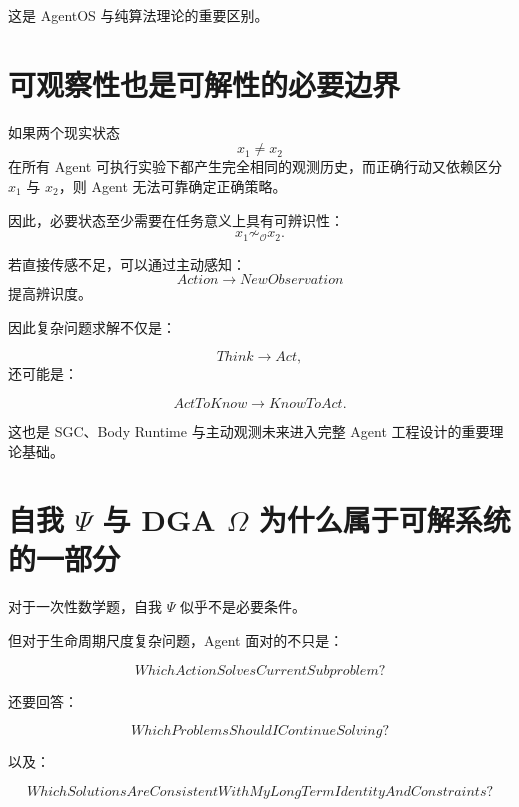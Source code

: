 这是 AgentOS 与纯算法理论的重要区别。

\section{可观察性也是可解性的必要边界}

如果两个现实状态
\begin{equation}
x_1\neq x_2
\end{equation}
在所有 Agent 可执行实验下都产生完全相同的观测历史，而正确行动又依赖区分 $x_1$ 与 $x_2$，则 Agent 无法可靠确定正确策略。

因此，必要状态至少需要在任务意义上具有可辨识性：
\begin{equation}
x_1
\not\sim_{\mathcal O}
x_2.
\end{equation}

若直接传感不足，可以通过主动感知：
\begin{equation}
Action
\rightarrow
NewObservation
\end{equation}
提高辨识度。

因此复杂问题求解不仅是：

\begin{equation}
Think\rightarrow Act,
\end{equation}
还可能是：

\begin{equation}
ActToKnow
\rightarrow
KnowToAct.
\end{equation}

这也是 SGC、Body Runtime 与主动观测未来进入完整 Agent 工程设计的重要理论基础。

\section{自我 $\Psi$ 与 DGA $\Omega$ 为什么属于可解系统的一部分}

对于一次性数学题，自我 $\Psi$ 似乎不是必要条件。

但对于生命周期尺度复杂问题，Agent 面对的不只是：

\begin{equation}
WhichActionSolvesCurrentSubproblem?
\end{equation}

还要回答：

\begin{equation}
WhichProblemsShouldIContinueSolving?
\end{equation}

以及：

\begin{equation}
WhichSolutionsAreConsistentWithMyLongTermIdentityAndConstraints?
\end{equation}

